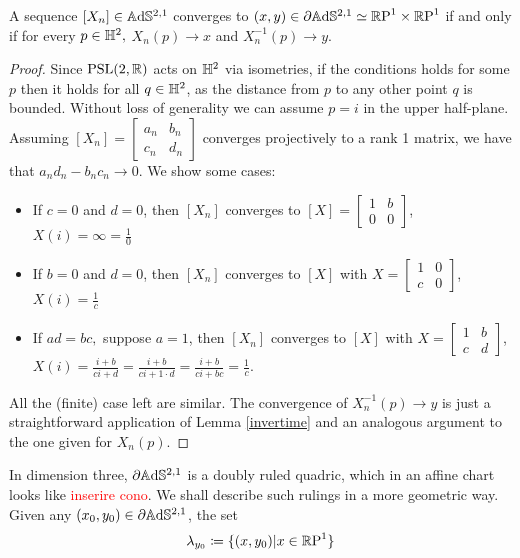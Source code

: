 \begin{lemma}\label{convergenza}
    A sequence $[X_n]\in\mathbb{A}\mathrm{d}\mathbb{S}^{2,1}$ converges to $(x,y)\in\partial\mathbb{A}\mathrm{d}\mathbb{S}^{2,1}\simeq\mathbb{R}\text{P}^1\times\mathbb{R}\text{P}^1$ if and only if for every $p\in\mathbb{H}^2,$ $X_n(p)\to x$ and $X_n^{-1}(p)\to y.$ 
\end{lemma}
\begin{proof}
    Since $\text{PSL}(2,\mathbb{R})$ acts on $\mathbb{H}^2$ via isometries, if the conditions holds for some $p$ then it holds for all $q\in\mathbb{H}^2$, as the distance from $p$ to any other point $q$ is bounded. Without loss of generality we can assume $p=i$ in the upper half-plane. Assuming $[X_n]=\begin{bmatrix}
        a_n & b_n \\
        c_n & d_n
    \end{bmatrix}$ converges projectively to a rank 1 matrix, we have that $a_nd_n-b_nc_n\rightarrow0$. We show some cases:
    \begin{itemize}
        \item If $c=0$ and $d=0$, then $[X_n]$ converges to $[X]=\begin{bmatrix}
            1 & b \\
            0 & 0\end{bmatrix}$, $X(i)=\infty=\frac{1}{0}$

        \item If $b=0$ and $d=0$, then $[X_n]$ converges to $[X]$ with $X=\begin{bmatrix}
            1 & 0 \\
            c & 0 \end{bmatrix}$, $X(i)=\frac{1}{c}$
        \item If $ad=bc,$ suppose $a=1$, then $[X_n]$ converges to $[X]$ with $X=\begin{bmatrix}
            1 & b \\
            c & d \end{bmatrix}$, $X(i)=\frac{i+b}{ci+d}=\frac{i+b}{ci+1\cdot d}=\frac{i+b}{ci+bc}=\frac{1}{c}$.
    \end{itemize}
    All the (finite) case left are similar.
    The convergence of $X_n^{-1}(p)\to y$ is just a straightforward application of Lemma \ref{invertime} and an analogous argument to the one given for $X_n(p)$.
\end{proof}

In dimension three, $\partial\mathbb{A}\mathrm{d}\mathbb{S}^{2,1}$ is a doubly ruled quadric, which in an affine chart looks like \textcolor{red}{inserire cono}. We shall describe such rulings in a more geometric way. Given any $(x_0,y_0)\in\partial\mathbb{A}\mathrm{d}\mathbb{S}^{2,1}$, the set
\begin{equation}\label{ruling}
        \lambda_{y_0}\coloneqq\{(x,y_0)|x\in\mathbb{R}\text{P}^1\}
\end{equation}

